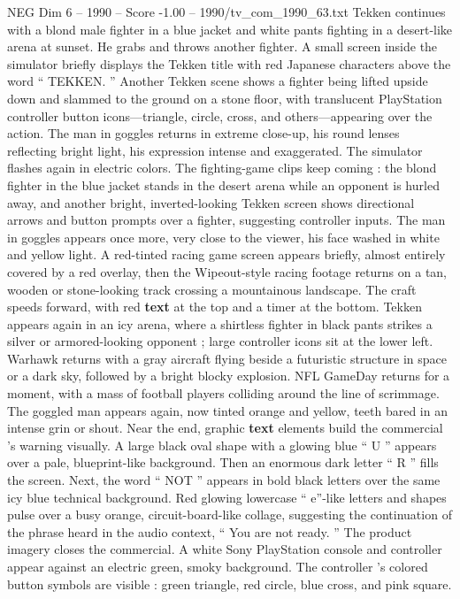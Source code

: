 \begin{textsample}{NEG Dim 6 – 1990 – Score -1.00 – 1990/tv\_com\_1990\_63.txt}
Tekken continues with a blond male fighter in a blue jacket and white pants fighting in a desert-like arena at sunset.
He grabs and throws another fighter.
A small screen inside the simulator briefly displays the Tekken title with red Japanese characters above the word “ TEKKEN. ” Another Tekken scene shows a fighter being lifted upside down and slammed to the ground on a stone floor, with translucent PlayStation controller button icons—triangle, circle, cross, and others—appearing over the action.
The man in goggles returns in extreme close-up, his round lenses reflecting bright light, his expression intense and exaggerated.
The simulator flashes again in electric colors.
The fighting-game clips keep coming : the blond fighter in the blue jacket stands in the desert arena while an opponent is hurled away, and another bright, inverted-looking Tekken screen shows directional arrows and button prompts over a fighter, suggesting controller inputs.
The man in goggles appears once more, very close to the viewer, his face washed in white and yellow light.
A red-tinted racing game screen appears briefly, almost entirely covered by a red overlay, then the Wipeout-style racing footage returns on a tan, wooden or stone-looking track crossing a mountainous landscape.
The craft speeds forward, with red \textbf{text} at the top and a timer at the bottom.
Tekken appears again in an icy arena, where a shirtless fighter in black pants strikes a silver or armored-looking opponent ; large controller icons sit at the lower left.
Warhawk returns with a gray aircraft flying beside a futuristic structure in space or a dark sky, followed by a bright blocky explosion.
NFL GameDay returns for a moment, with a mass of football players colliding around the line of scrimmage.
The goggled man appears again, now tinted orange and yellow, teeth bared in an intense grin or shout.
Near the end, graphic \textbf{text} elements build the commercial ’s warning visually.
A large black oval shape with a glowing blue “ U ” appears over a pale, blueprint-like background.
Then an enormous dark letter “ R ” fills the screen.
Next, the word “ NOT ” appears in bold black letters over the same icy blue technical background.
Red glowing lowercase “ e”-like letters and shapes pulse over a busy orange, circuit-board-like collage, suggesting the continuation of the phrase heard in the audio context, “ You are not ready. ” The product imagery closes the commercial.
A white Sony PlayStation console and controller appear against an electric green, smoky background.
The controller ’s colored button symbols are visible : green triangle, red circle, blue cross, and pink square.

\end{textsample}
